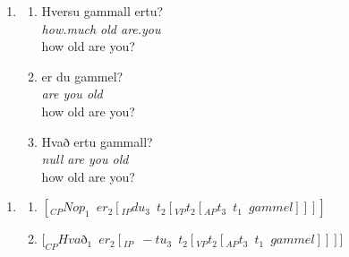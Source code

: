 \documentclass{ctexart}
\begin{document}
\begin{enumerate}[resume]
    \item \label{Icelandic_example}
    
    \begin{enumerate}[ref=(\arabic{enumi}\alph*)]
        \item \label{Icelandic_example_10}
        Hversu gammall ertu? \\
        \textit{how.much old are.you} \\
        how old are you?

        \item \label{Icelandic_example_a}
        er du gammel? \\
        \textit{are you old} \\
        how old are you?

        \item \label{Icelandic_example_b}
        Hvað ertu gammall? \\
        \textit{null are you old} \\
        how old are you?

    \end{enumerate}   
    
\end{enumerate}

\begin{enumerate}[resume]
    \item \label{Icelandic_example_LE}
    
    \begin{enumerate}[ref=(\arabic{enumi}\alph*)]
        \item $[_{CP}Nop_1 \enspace er_2[_{IP}du_3 \enspace t_2[_{VP} t_2[_{AP} t_3 \enspace t_1 \enspace gammel]]]]$
        
        \item $[_{CP}Hva$ð$_1 \enspace er_2[_{IP} \enspace -tu_3 \enspace t_2 [_{VP}t_2[_{AP}t_3 \enspace t_1 \enspace gammel]]]]$
        
    \end{enumerate}   
    
\end{enumerate}
\end{document}
